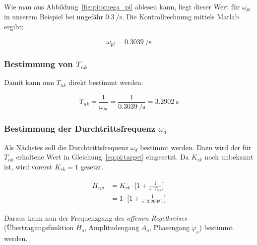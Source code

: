 Wie    man   aus    Abbildung~\ref{fig:pi:omega_pi}   ablesen    kann,   liegt
dieser   Wert  f\"ur   $\omega_{pi}$  in   unserem  Beispiel   bei  ungef\"ahr
$\SI{0.3}{\per\second}$. Die Kontrollrechnung mittels Matlab ergibt:

\begin{equation} \label{eq:pi:omega_pi}
    \omega_{pi} = \SI{0.3039}{\per\second}
\end{equation}


\clearpage
\subsubsection{Bestimmung von $T_{nk}$}
Damit kann nun $T_{nk}$ direkt bestimmt werden\footnotemark[2]:

\begin{equation} \label{eq:pi:omega_pi}
    T_{nk} = \frac{1}{\omega_{pi}} = \frac{1}{\SI{0.3039}{\per\second}} = \SI{3.2902}{\second}
\end{equation}



\subsubsection{Bestimmung der Durchtrittsfrequenz $\omega_d$}

Als N\"achstes  soll die Durchtrittsfrequenz $\omega_d$  bestimmt werden. Dazu
wird  der  f\"ur  $T_{nk}$  erhaltene  Wert  in  Gleichung~\ref{eq:pi:target}
eingesetzt. Da $K_{rk}$ noch unbekannt ist, wird vorerst $K_{rk} = 1$ gesetzt.

\begin{gather} \label{eq:pi:target}
    \begin{split}
        H_{rpi} & = K_{rk} \cdot \biggl[ 1 + \frac{1}{s \cdot T_{nk}} \biggr] \\
                & = 1      \cdot \biggl[ 1 + \frac{1}{s \cdot \SI{3.2902}{\second}} \biggr]
    \end{split}
\end{gather}

Daraus   kann   nun   der   Frequenzgang   des   \emph{offenen   Regelkreises}
(\"Ubertragungsfunktion $H_o$,  Amplitudengang $A_o$,  Phasengang $\varphi_o$)
bestimmt werden.

